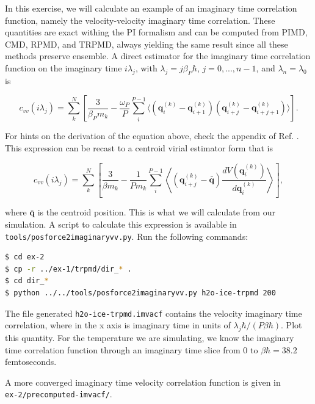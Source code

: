 \documentclass{article}
\begin{document}
\begin{Exercise}[label={imaginarytime},title={Velocity imaginary time correlation function}]

In this exercise, we will calculate an example of an imaginary time correlation function, namely the velocity-velocity imaginary time correlation. These quantities are exact withing the PI formalism and can be computed from PIMD, CMD, RPMD, and TRPMD, always yielding the same result since all these methods preserve ensemble. A direct estimator for the imaginary time correlation function on the imaginary time $i \lambda_j$, with $\lambda_j=j\beta_P\hbar$, $j=0,...,n-1$, and $\lambda_n=\lambda_0$ is

\begin{equation}
c_{vv}(i \lambda_j ) = \sum_k^N \left[ \frac{3}{\beta_P m_k} - \frac{\omega_P}{P} \sum_i^{P-1} \langle (\mathbf{q}_i^{(k)}-\mathbf{q}_{i+1}^{(k)})(\mathbf{q}_{i+j}^{(k)}-\mathbf{q}_{i+j+1}^{(k)}) \rangle\right].
\end{equation}

For hints on the derivation of the equation above, check the appendix of Ref. \cite{habe+07jcp}. This expression can be recast to a centroid virial estimator form that is


\begin{equation}
c_{vv}(i \lambda_j ) = \sum_k^N \left[ \frac{3}{\beta m_k} - \frac{1}{P m_k} \sum_i^{P-1} \left\langle (\mathbf{q}_{i+j}^{(k)}-\bar{\mathbf{q}})  \frac{dV(\mathbf{q}_i^{(k)})}{d \mathbf{q}_i^{(k)}} \right\rangle\right],
\end{equation}

\noindent where $\bar{\mathbf{q}}$ is the centroid position. This is what we will calculate from our simulation. A script to calculate this expression is available in \texttt{tools/posforce2imaginaryvv.py}. Run the following commands:

\begin{lstlisting}[language=Bash,emph={\$}]
$ cd ex-2
$ cp -r ../ex-1/trpmd/dir_* .
$ cd dir_*
$ python ../../tools/posforce2imaginaryvv.py h2o-ice-trpmd 200
\end{lstlisting}

The file generated \texttt{h2o-ice-trpmd.imvacf} contains the velocity imaginary time correlation, where in the x axis is imaginary time in units of $\lambda_j \hbar/(P \beta \hbar)$. Plot this quantity. For the temperature we are simulating, we know the imaginary time correlation function through an imaginary time slice from $0$ to $\beta \hbar = 38.2$ femtoseconds. 

A more converged imaginary time velocity correlation function is given in \\
\texttt{ex-2/precomputed-imvacf/}.

\end{Exercise}
\end{document}
